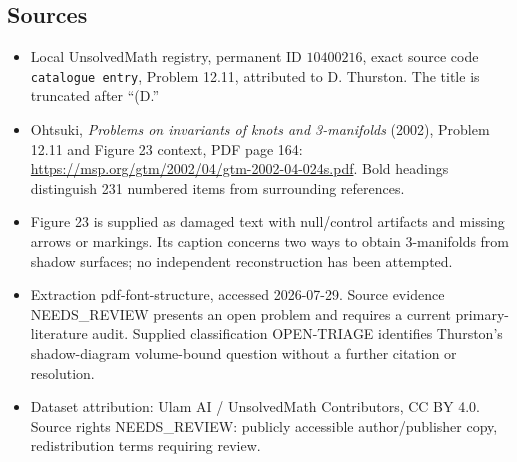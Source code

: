 \documentclass[11pt]{article}
\begin{document}
\subsection{Sources}
\begin{itemize}
\item Local UnsolvedMath registry, permanent ID \(10400216\), exact source code \texttt{catalogue entry}, Problem 12.11, attributed to D. Thurston. The title is truncated after ``(D.''
\item Ohtsuki, \emph{Problems on invariants of knots and 3-manifolds} (2002), Problem 12.11 and Figure 23 context, PDF page 164: \url{https://msp.org/gtm/2002/04/gtm-2002-04-024s.pdf}. Bold headings distinguish 231 numbered items from surrounding references.
\item Figure 23 is supplied as damaged text with null/control artifacts and missing arrows or markings. Its caption concerns two ways to obtain \(3\)-manifolds from shadow surfaces; no independent reconstruction has been attempted.
\item Extraction pdf-font-structure, accessed 2026-07-29. Source evidence NEEDS\_REVIEW presents an open problem and requires a current primary-literature audit. Supplied classification OPEN-TRIAGE identifies Thurston's shadow-diagram volume-bound question without a further citation or resolution.
\item Dataset attribution: Ulam AI / UnsolvedMath Contributors, CC BY 4.0. Source rights NEEDS\_REVIEW: publicly accessible author/publisher copy, redistribution terms requiring review.
\end{itemize}
\end{document}
